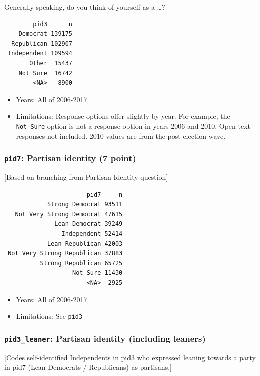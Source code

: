 \documentclass[10pt,article,oneside]{memoir}
\theoremstyle{definition}
\begin{document}
Generally speaking, do you think of yourself as a \ldots{}?

\begin{verbatim}
        pid3      n
    Democrat 139175
  Republican 102907
 Independent 109594
       Other  15437
    Not Sure  16742
        <NA>   8900
\end{verbatim}

\begin{itemize}
\tightlist
\item
  Years: All of 2006-2017
\item
  Limitations: Response options offer slightly by year. For example, the
  \texttt{Not\ Sure} option is not a response option in years 2006 and
  2010. Open-text responses not included. 2010 values are from the
  post-election wave.
\end{itemize}

\subsubsection{\texorpdfstring{\texttt{pid7}: Partisan identity (7
point)}{pid7: Partisan identity (7 point)}}\label{pid7-partisan-identity-7-point}

{[}Based on branching from Partisan Identity question{]}

\begin{verbatim}
                       pid7     n
            Strong Democrat 93511
   Not Very Strong Democrat 47615
              Lean Democrat 39249
                Independent 52414
            Lean Republican 42003
 Not Very Strong Republican 37883
          Strong Republican 65725
                   Not Sure 11430
                       <NA>  2925
\end{verbatim}

\begin{itemize}
\tightlist
\item
  Years: All of 2006-2017
\item
  Limitations: See \texttt{pid3}
\end{itemize}

\subsubsection{\texorpdfstring{\texttt{pid3\_leaner}: Partisan identity
(including
leaners)}{pid3\_leaner: Partisan identity (including leaners)}}\label{pid3_leaner-partisan-identity-including-leaners}

{[}Codes self-identified Independents in pid3 who expressed leaning
towards a party in pid7 (Lean Democrats / Republicans) as partisans.{]}
\end{document}
